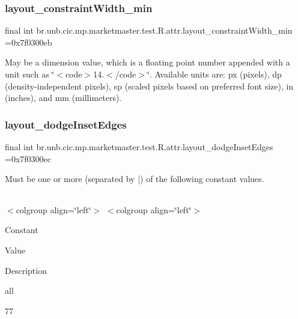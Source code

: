 \subsubsection{\texorpdfstring{layout\+\_\+constraint\+Width\+\_\+min}{layout\_constraintWidth\_min}}
{\footnotesize\ttfamily final int br.\+unb.\+cic.\+mp.\+marketmaster.\+test.\+R.\+attr.\+layout\+\_\+constraint\+Width\+\_\+min =0x7f0300eb\hspace{0.3cm}{\ttfamily [static]}}

May be a dimension value, which is a floating point number appended with a unit such as \char`\"{}$<$code$>$14.\+5sp$<$/code$>$\char`\"{}. Available units are\+: px (pixels), dp (density-\/independent pixels), sp (scaled pixels based on preferred font size), in (inches), and mm (millimeters). \mbox{\label{classbr_1_1unb_1_1cic_1_1mp_1_1marketmaster_1_1test_1_1R_1_1attr_abaca2e27db535a3d2604952f2e8aeeeb}} 
\subsubsection{\texorpdfstring{layout\+\_\+dodge\+Inset\+Edges}{layout\_dodgeInsetEdges}}
{\footnotesize\ttfamily final int br.\+unb.\+cic.\+mp.\+marketmaster.\+test.\+R.\+attr.\+layout\+\_\+dodge\+Inset\+Edges =0x7f0300ec\hspace{0.3cm}{\ttfamily [static]}}

Must be one or more (separated by \textquotesingle{}$\vert$\textquotesingle{}) of the following constant values.

\tabulinesep=1mm
\begin{longtabu} spread 0pt [c]{*{0}{|X[-1]}|}
\hline
\end{longtabu}
$<$colgroup align=\char`\"{}left\char`\"{}$>$ $<$colgroup align=\char`\"{}left\char`\"{}$>$ 

Constant

Value

Description 

all

77

